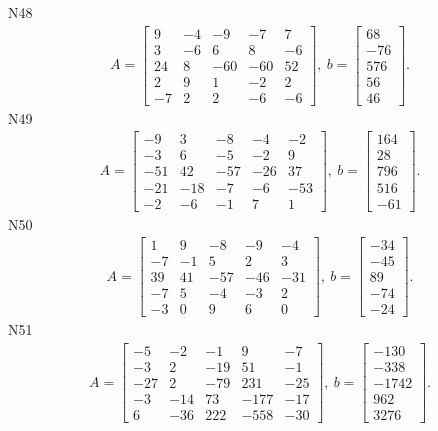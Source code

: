 \documentclass[11pt]{report}
\begin{document}
N48
\begin{align*}
 A = \left[\begin{matrix}9 & -4 & -9 & -7 & 7\\3 & -6 & 6 & 8 & -6\\24 & 8 & -60 & -60 & 52\\2 & 9 & 1 & -2 & 2\\-7 & 2 & 2 & -6 & -6\end{matrix}\right],
\ b = \left[\begin{matrix}68\\-76\\576\\56\\46\end{matrix}\right]. 
 \end{align*}
N49
\begin{align*}
 A = \left[\begin{matrix}-9 & 3 & -8 & -4 & -2\\-3 & 6 & -5 & -2 & 9\\-51 & 42 & -57 & -26 & 37\\-21 & -18 & -7 & -6 & -53\\-2 & -6 & -1 & 7 & 1\end{matrix}\right],
\ b = \left[\begin{matrix}164\\28\\796\\516\\-61\end{matrix}\right]. 
 \end{align*}
N50
\begin{align*}
 A = \left[\begin{matrix}1 & 9 & -8 & -9 & -4\\-7 & -1 & 5 & 2 & 3\\39 & 41 & -57 & -46 & -31\\-7 & 5 & -4 & -3 & 2\\-3 & 0 & 9 & 6 & 0\end{matrix}\right],
\ b = \left[\begin{matrix}-34\\-45\\89\\-74\\-24\end{matrix}\right]. 
 \end{align*}
N51
\begin{align*}
 A = \left[\begin{matrix}-5 & -2 & -1 & 9 & -7\\-3 & 2 & -19 & 51 & -1\\-27 & 2 & -79 & 231 & -25\\-3 & -14 & 73 & -177 & -17\\6 & -36 & 222 & -558 & -30\end{matrix}\right],
\ b = \left[\begin{matrix}-130\\-338\\-1742\\962\\3276\end{matrix}\right]. 
 \end{align*}
\end{document}
